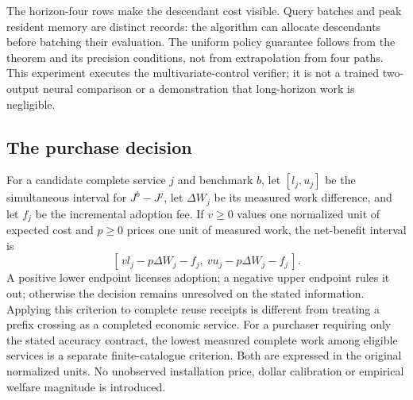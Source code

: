 The horizon-four rows make the descendant cost visible. Query batches and peak resident memory are distinct records: the algorithm can allocate descendants before batching their evaluation. The uniform policy guarantee follows from the theorem and its precision conditions, not from extrapolation from four paths. This experiment executes the multivariate-control verifier; it is not a trained two-output neural comparison or a demonstration that long-horizon work is negligible.

\subsection{The purchase decision}
For a candidate complete service $j$ and benchmark $b$, let $[l_j,u_j]$ be the simultaneous interval for $J^b-J^j$, let $\Delta W_j$ be its measured work difference, and let $f_j$ be the incremental adoption fee. If $v\ge0$ values one normalized unit of expected cost and $p\ge0$ prices one unit of measured work, the net-benefit interval is
\begin{equation}\label{eq:purchase67}
 [\,v l_j-p\Delta W_j-f_j,\ v u_j-p\Delta W_j-f_j\,].
\end{equation}
A positive lower endpoint licenses adoption; a negative upper endpoint rules it out; otherwise the decision remains unresolved on the stated information. Applying this criterion to complete reuse receipts is different from treating a prefix crossing as a completed economic service. For a purchaser requiring only the stated accuracy contract, the lowest measured complete work among eligible services is a separate finite-catalogue criterion. Both are expressed in the original normalized units. No unobserved installation price, dollar calibration or empirical welfare magnitude is introduced.

